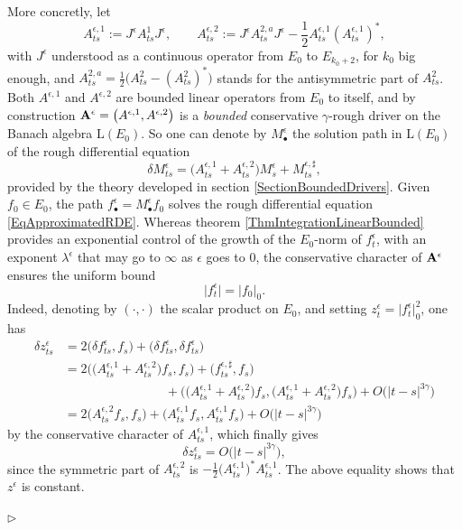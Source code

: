 \documentclass[11pt,a4paper]{amsart}
\numberwithin{equation}{section} %
\newenvironment{Dem}{%
    \begin{list}{\hspace{0.5cm}{\sc Proof --}}{%
        \setlength{\topsep}{0pt}%
        \setlength{\leftmargin}{0pt}%
        \setlength{\rightmargin}{0pt}%
        \setlength{\listparindent}{0pt}%
        \setlength{\itemindent}{0pt}%
        \setlength{\parsep}{0pt}%
        \addtolength{\leftmargin}{20pt}%
        \addtolength{\rightmargin}{0pt}%
    } \item }{\hfill{\space $\rhd$}\end{list}\smallskip}
\begin{document}
\begin{Dem}
More concretly, let 
$$
A^{\epsilon,1}_{ts} := J^\epsilon A^1_{ts}J^\epsilon,\quad\quad A^{\epsilon,2}_{ts} := J^\epsilon A^{2,a}_{ts}J^\epsilon - \frac1 2 A^{\epsilon,1}_{ts} (A^{\epsilon,1}_{ts})^*,
$$
with $J^\epsilon$ understood as a continuous operator from $E_0$ to $E_{k_0+2}$, for $k_0$ big enough, and $A^{2,a}_{ts} = \frac{1}{2}\big(A^2_{ts}-(A^2_{ts})^*\big)$ stands for the antisymmetric part of $A^{2}_{ts}$. Both $A^{\epsilon,1}$ and $A^{\epsilon,2}$ are bounded linear operators from $E_0$ to itself, and by construction ${\bf A}^\epsilon = \big(A^{\epsilon,1},A^{\epsilon,2}\big)$ is a \emph{bounded} conservative $\gamma$-rough driver on the Banach algebra $\textrm{L}(E_0)$. So one can denote by $M^\epsilon_\bullet$ the solution path in $\textrm{L}(E_0)$ of the rough differential equation
$$
\delta M^\epsilon_{ts} = \Big(A^{\epsilon,1}_{ts} + A^{\epsilon,2}_{ts}\Big)M^\epsilon_s + M^{\epsilon,\sharp}_{ts},
$$
provided by the theory developed in section \ref{SectionBoundedDrivers}. Given $f_0\in E_0$, the path $f^\epsilon_\bullet = M^\epsilon_\bullet f_0$ solves the rough differential equation \eqref{EqApproximatedRDE}. Whereas theorem \ref{ThmIntegrationLinearBounded} provides an exponential control of the growth of the $E_0$-norm of $f^\epsilon_t$, with an exponent $\lambda^\epsilon$ that may go to $\infty$ as $\epsilon$ goes to $0$, the conservative character of ${\bf A}^\epsilon$ ensures the uniform bound
\begin{equation*}
\big| f^\epsilon_t\big| = \big| f_0\big|_0.
\end{equation*}
Indeed, denoting by $(\cdot,\cdot)$ the scalar product on $E_0$, and setting $z^\epsilon_t = \big|f^\epsilon_t\big|^2_0$, one has
\begin{equation*}
\begin{split}
\delta z^\epsilon_{ts} &= 2\big(\delta f^\epsilon_{ts},f_s\big) + \big(\delta f^\epsilon_{ts}, \delta f^\epsilon_{ts}\big) \\
                                    &= 2\Big(\big(A^{\epsilon,1}_{ts}+A^{\epsilon,2}_{ts}\big)f_s , f_s\Big) + \big(f^{\epsilon,\sharp}_{ts},f_s\big) \\
                                    &\quad\quad\quad\quad\quad\quad\quad\quad+ \Big(\big(A^{\epsilon,1}_{ts}+A^{\epsilon,2}_{ts}\big)f_s , \big(A^{\epsilon,1}_{ts}+A^{\epsilon,2}_{ts}\big)f_s\Big) + O\big(|t-s|^{3\gamma}\big) \\
                                    &= 2\Big(A^{\epsilon,2}_{ts}f_s , f_s\Big) + \Big(A^{\epsilon,1}_{ts}f_s , A^{\epsilon,1}_{ts}f_s\Big) + O\big(|t-s|^{3\gamma}\big)
\end{split}
\end{equation*} 
by the conservative character of $A^{\epsilon,1}_{ts}$, which finally gives
$$
\delta z^\epsilon_{ts} = O\big(|t-s|^{3\gamma}\big),
$$
since the symmetric part of $A^{\epsilon,2}_{ts}$ is $-\frac{1}{2}\big(A^{\epsilon,1}_{ts}\big)^*A^{\epsilon,1}_{ts}$. The above equality shows that $z^\epsilon$ is constant.


\end{Dem}
\end{document}
